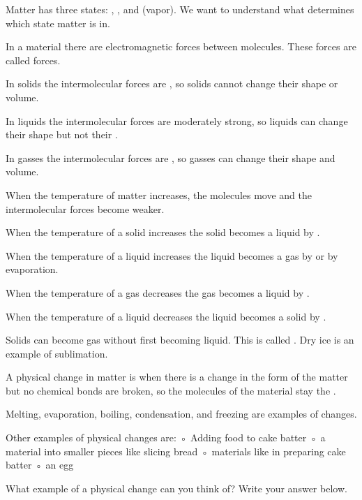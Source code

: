 \documentclass[12pt]{exam}
\begin{document}
\begin{questions}
  
  \question Matter has three states: \fillin, \fillin, and \fillin (vapor).  We want to understand what determines which state matter is in.

  \question In a material there are electromagnetic forces between molecules.  These forces are called \fillin forces.
  
  \question In solids the intermolecular forces are \fillin, so solids cannot change their shape or volume.
  
  \question In liquids the intermolecular forces are moderately strong, so liquids can change their shape but not their \fillin.
  
  \question In gasses the intermolecular forces are \fillin, so gasses can change their shape and volume.
  
  \question When the temperature of matter increases, the molecules move \fillin and the intermolecular forces become weaker.
  
  \question When the temperature of a solid increases the solid becomes a liquid by \fillin.  
  
  \question When the temperature of a liquid increases the liquid becomes a gas by \fillin or by evaporation.
  
  \question When the temperature of a gas decreases the gas becomes a liquid by \fillin.
  
  \question When the temperature of a liquid decreases the liquid becomes a solid by \fillin.
  
  \question Solids can become gas without first becoming liquid.  This is called \fillin.  Dry ice is an example of sublimation.
  
  \question A physical change in matter is when there is a change in the form of the matter but no chemical bonds are broken, so the molecules of the material stay the \fillin.
  
  \question Melting, evaporation, boiling, condensation, and freezing are examples of \fillin changes.
  
  \question Other examples of physical changes are:
      ◦ Adding food \fillin to cake batter
      ◦ \fillin a material into smaller pieces like slicing bread
      ◦ \fillin materials like in preparing cake batter
      ◦ \fillin an egg

  \question What example of a physical change can you think of?  Write your answer below.



\end{questions}
\end{document}
